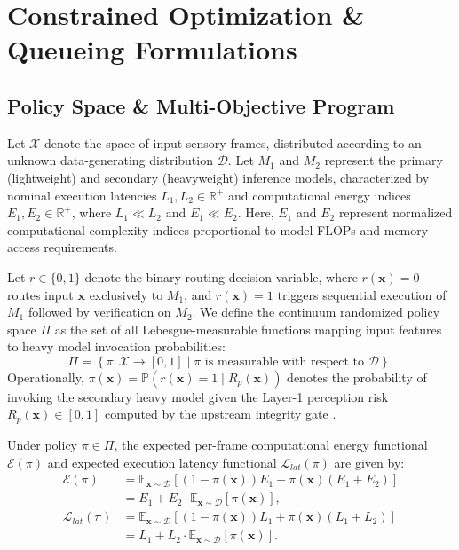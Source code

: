 \documentclass[conference]{IEEEtran}
\begin{document}
\section{Constrained Optimization \& Queueing Formulations}
\subsection{Policy Space \& Multi-Objective Program}
Let $\mathcal{X}$ denote the space of input sensory frames, distributed according to an unknown data-generating distribution $\mathcal{D}$. Let $M_1$ and $M_2$ represent the primary (lightweight) and secondary (heavyweight) inference models, characterized by nominal execution latencies $L_1, L_2 \in \mathbb{R}^+$ and computational energy indices $E_1, E_2 \in \mathbb{R}^+$, where $L_1 \ll L_2$ and $E_1 \ll E_2$. Here, $E_1$ and $E_2$ represent normalized computational complexity indices proportional to model FLOPs and memory access requirements.

Let $r \in \{0, 1\}$ denote the binary routing decision variable, where $r(\mathbf{x})=0$ routes input $\mathbf{x}$ exclusively to $M_1$, and $r(\mathbf{x})=1$ triggers sequential execution of $M_1$ followed by verification on $M_2$. We define the continuum randomized policy space $\Pi$ as the set of all Lebesgue-measurable functions mapping input features to heavy model invocation probabilities:
\begin{equation}
\Pi = \left\{ \pi: \mathcal{X} \to [0, 1] \mid \pi \text{ is measurable with respect to } \mathcal{D} \right\}.
\end{equation}
Operationally, $\pi(\mathbf{x}) = \mathbb{P}(r(\mathbf{x}) = 1 \mid R_p(\mathbf{x}))$ denotes the probability of invoking the secondary heavy model given the Layer-1 perception risk $R_p(\mathbf{x}) \in [0, 1]$ computed by the upstream integrity gate \cite{kumar2026scholar22}.

Under policy $\pi \in \Pi$, the expected per-frame computational energy functional $\mathcal{E}(\pi)$ and expected execution latency functional $\mathcal{L}_{lat}(\pi)$ are given by:
\begin{align}
\mathcal{E}(\pi) &= \mathbb{E}_{\mathbf{x} \sim \mathcal{D}} \left[ (1 - \pi(\mathbf{x})) E_1 + \pi(\mathbf{x}) (E_1 + E_2) \right] \nonumber \\
&= E_1 + E_2 \cdot \mathbb{E}_{\mathbf{x} \sim \mathcal{D}} [\pi(\mathbf{x})], \\
\mathcal{L}_{lat}(\pi) &= \mathbb{E}_{\mathbf{x} \sim \mathcal{D}} \left[ (1 - \pi(\mathbf{x})) L_1 + \pi(\mathbf{x}) (L_1 + L_2) \right] \nonumber \\
&= L_1 + L_2 \cdot \mathbb{E}_{\mathbf{x} \sim \mathcal{D}} [\pi(\mathbf{x})].
\end{align}
\end{document}
